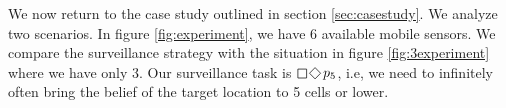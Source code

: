 We now return to the case study outlined in section \ref{sec:casestudy}. We analyze two scenarios. In figure \ref{fig:experiment}, we have 6 available mobile sensors. We compare the surveillance strategy with the situation in figure \ref{fig:3experiment} where we have only 3. Our surveillance task is $\LTLsquare \LTLdiamond p_5$, i.e, we need to infinitely often bring the belief of the target location to 5 cells or lower. 

\begin{figure}
{}
\end{figure}
